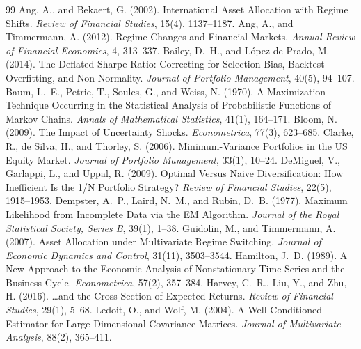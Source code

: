 \documentclass[12pt,a4paper]{article}
\begin{document}
\clearpage
{}
\begin{thebibliography}{99}
 Ang, A., and Bekaert, G. (2002). International Asset Allocation with Regime Shifts. \textit{Review of Financial Studies}, 15(4), 1137--1187.
 Ang, A., and Timmermann, A. (2012). Regime Changes and Financial Markets. \textit{Annual Review of Financial Economics}, 4, 313--337.
 Bailey, D.~H., and L\'opez de Prado, M. (2014). The Deflated Sharpe Ratio: Correcting for Selection Bias, Backtest Overfitting, and Non-Normality. \textit{Journal of Portfolio Management}, 40(5), 94--107.
 Baum, L.~E., Petrie, T., Soules, G., and Weiss, N. (1970). A Maximization Technique Occurring in the Statistical Analysis of Probabilistic Functions of Markov Chains. \textit{Annals of Mathematical Statistics}, 41(1), 164--171.
 Bloom, N. (2009). The Impact of Uncertainty Shocks. \textit{Econometrica}, 77(3), 623--685.
 Clarke, R., de Silva, H., and Thorley, S. (2006). Minimum-Variance Portfolios in the US Equity Market. \textit{Journal of Portfolio Management}, 33(1), 10--24.
 DeMiguel, V., Garlappi, L., and Uppal, R. (2009). Optimal Versus Naive Diversification: How Inefficient Is the 1/N Portfolio Strategy? \textit{Review of Financial Studies}, 22(5), 1915--1953.
 Dempster, A.~P., Laird, N.~M., and Rubin, D.~B. (1977). Maximum Likelihood from Incomplete Data via the EM Algorithm. \textit{Journal of the Royal Statistical Society, Series B}, 39(1), 1--38.
 Guidolin, M., and Timmermann, A. (2007). Asset Allocation under Multivariate Regime Switching. \textit{Journal of Economic Dynamics and Control}, 31(11), 3503--3544.
 Hamilton, J.~D. (1989). A New Approach to the Economic Analysis of Nonstationary Time Series and the Business Cycle. \textit{Econometrica}, 57(2), 357--384.
 Harvey, C.~R., Liu, Y., and Zhu, H. (2016). \ldots and the Cross-Section of Expected Returns. \textit{Review of Financial Studies}, 29(1), 5--68.
 Ledoit, O., and Wolf, M. (2004). A Well-Conditioned Estimator for Large-Dimensional Covariance Matrices. \textit{Journal of Multivariate Analysis}, 88(2), 365--411.

\end{thebibliography}
\end{document}
